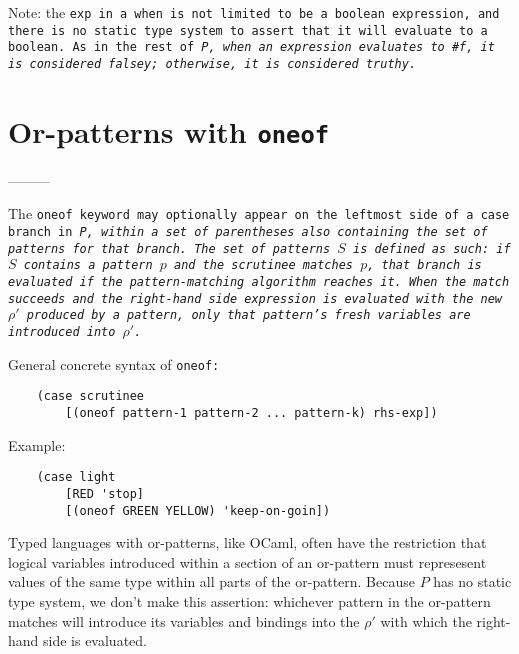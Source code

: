 \documentclass[]{article}
\begin{document}
\medskip

Note: the \tt{exp} in a \tt{when} is not limited to be a boolean expression, 
and there is no static type system to assert that it will evaluate to a boolean.
As in the rest of \it{P}, when an expression evaluates to \tt{\#f}, it
is considered falsey; otherwise, it is considered truthy. 

\medskip


\section{Or-patterns with \tt{oneof}}

\medskip

---------


The \tt{oneof} keyword may optionally appear on the leftmost side of a \tt{case}
branch in \it{P}, within a set of parentheses also containing the set of 
patterns for that branch. The set of patterns $S$ is defined as such: if $S$ 
contains a pattern $p$ and the scrutinee matches $p$, that branch is evaluated
if the pattern-matching algorithm reaches it. 
When the match succeeds and the right-hand
side expression is evaluated with the new $\rho'$ produced by a pattern, only 
that pattern's fresh variables are introduced into $\rho'$. 

\medskip

General concrete syntax of \tt{oneof}: 


\begin{verbatim}
    (case scrutinee
        [(oneof pattern-1 pattern-2 ... pattern-k) rhs-exp])
\end{verbatim}


Example: 
\begin{verbatim}
    (case light
        [RED 'stop]
        [(oneof GREEN YELLOW) 'keep-on-goin])
\end{verbatim}



\medskip

Typed languages with or-patterns, like OCaml, often have the restriction that
logical variables introduced within a section of an or-pattern must represesent
values of the same type within all parts of the or-pattern. Because $P$ has no
static type system, we don't make this assertion: whichever pattern in the
or-pattern matches will introduce its variables and bindings into the $\rho'$
with which the right-hand side is evaluated. 
\end{document}
